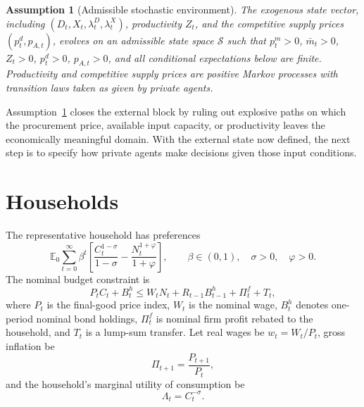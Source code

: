 ﻿\documentclass[12pt]{article}
\newtheorem{assumption}{Assumption}
\theoremstyle{remark}
\newcommand{\E}{\mathbb E}
\begin{document}
\begin{assumption}[Admissible stochastic environment]\label{ass:admissible_env}
The exogenous state vector, including $(D_t,X_t,\lambda_t^D,\lambda_t^X)$, productivity $Z_t$, and
the competitive supply prices $(p_t^d,p_{A,t})$, evolves on an admissible state space
$\mathcal S$ such that $p_t^m>0$, $\bar m_t>0$, $Z_t>0$, $p_t^d>0$, $p_{A,t}>0$, and all
conditional expectations below are finite. Productivity and competitive supply prices are positive
Markov processes with transition laws taken as given by private agents.
\end{assumption}

Assumption~\ref{ass:admissible_env} closes the external block by ruling out explosive paths on
which the procurement price, available input capacity, or productivity leaves the economically
meaningful domain. With the external state now defined, the next step is to specify how private
agents make decisions given those input conditions.

\section{Households}

The representative household has preferences
\begin{equation}
    \E_0\sum_{t=0}^\infty \beta^t
    \left[
        \frac{C_t^{1-\sigma}}{1-\sigma}
        -
        \frac{N_t^{1+\varphi}}{1+\varphi}
    \right],
    \qquad
    \beta\in(0,1),\quad \sigma>0,\quad \varphi>0.
    \label{eq:hh_preferences}
\end{equation}
The nominal budget constraint is
\begin{equation}
    P_t C_t + B_t^h
    \le
    W_t N_t + R_{t-1}B_{t-1}^h + \Pi_t^f + T_t,
    \label{eq:hh_budget_nominal}
\end{equation}
where $P_t$ is the final-good price index, $W_t$ is the nominal wage, $B_t^h$ denotes one-period
nominal bond holdings, $\Pi_t^f$ is nominal firm profit rebated to the household, and $T_t$ is a
lump-sum transfer. Let real wages be $w_t=W_t/P_t$, gross inflation be
\begin{equation}
    \Pi_{t+1}=\frac{P_{t+1}}{P_t},
    \label{eq:inflation_def}
\end{equation}
and the household's marginal utility of consumption be
\begin{equation}
    \Lambda_t=C_t^{-\sigma}.
    \label{eq:lambda_def}
\end{equation}
\end{document}
